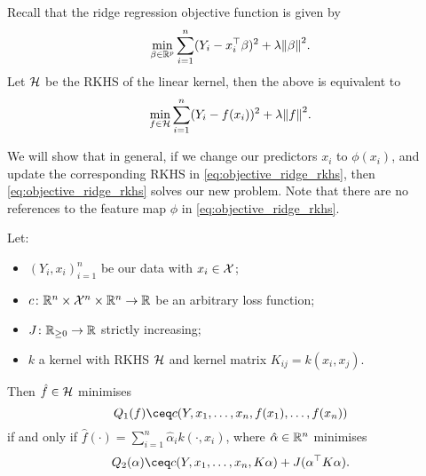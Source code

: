 Recall that the ridge regression objective function is given by
\[
\min_{\beta \in \mathbb R^p} \sum_{i=1}^n (Y_i - x_i^\top \beta)^2 + \lambda\norm{\beta}^2. 
\]
Let $\mathcal H$ be the RKHS of the linear kernel, then the above is equivalent to
\begin{equation} \label{eq:objective_ridge_rkhs}
\min_{f \in \mathcal H} \sum_{i=1}^n (Y_i - f(x_i))^2 + \lambda \norm{f}^2. 
\end{equation}

We will show that in general, if we change our predictors $x_i$ to $\phi(x_i)$, and update the corresponding RKHS in \cref{eq:objective_ridge_rkhs}, then \cref{eq:objective_ridge_rkhs} solves our new problem. Note that there are no references to the feature map $\phi$ in \cref{eq:objective_ridge_rkhs}. 

\begin{theorem}
Let:
\begin{itemize}
	\item $(Y_i, x_i)_{i=1}^n$ be our data with $x_i \in \mathcal X$;
	\item $c \colon \mathbb R^n \times \mathcal X^n \times \mathbb R^n \to \mathbb R$ be an arbitrary loss function;
	\item $J \colon \mathbb R_{\geq 0} \to \mathbb R$ strictly increasing;
	\item $k$ a kernel with RKHS $\mathcal H$ and kernel matrix $K_{ij} = k(x_i, x_j)$. 
\end{itemize}
Then $\hat f \in \mathcal H$ minimises
\begin{equation*} %
Q_1(f) \ceq c(Y, x_1, \dotsc, x_n, f(x_1), \dotsc, f(x_n))
\end{equation*}
if and only if $\hat f(\cdot) = \sum_{i=1}^n \hat\alpha_i k(\cdot, x_i)$, where $\hat\alpha \in \mathbb R^n$ minimises
\begin{equation*} %
Q_2(\alpha) \ceq c(Y, x_1, \dotsc, x_n, K\alpha) + J(\alpha\T K\alpha). 
\end{equation*}
\end{theorem}

